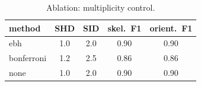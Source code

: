 \begin{table}[htbp]
\centering
\caption{Ablation: multiplicity control.}
\label{tab:abl_mult}
\begin{tabular}{lcccc}
\hline
method & SHD & SID & skel.\ F1 & orient.\ F1 \\
\hline
ebh & 1.0 & 2.0 & 0.90 & 0.90 \\
bonferroni & 1.2 & 2.5 & 0.86 & 0.86 \\
none & 1.0 & 2.0 & 0.90 & 0.90 \\
\hline
\end{tabular}
\end{table}
